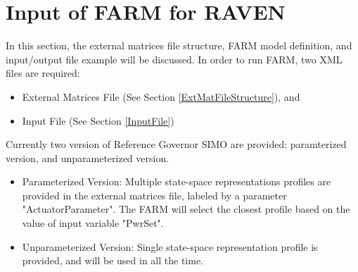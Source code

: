 



\section{Input of FARM for RAVEN}

In this section, the external matrices file structure, FARM model definition, and input/output file example will be 
discussed. In order to run FARM, two XML files are required:
\begin{itemize}
  \item External Matrices File (See Section \ref{ExtMatFileStructure}), and
  \item Input File (See Section \ref{InputFile})
\end{itemize}
Currently two version of Reference Governor SIMO are provided: paramterized version, and unparameterized version. 
\begin{itemize}
  \item Parameterized Version: Multiple state-space representations profiles are provided in the external matrices file, 
  labeled by a parameter "ActuatorParameter". The FARM will select the closest profile based on the value of input 
  variable "PwrSet".
  \item Unparameterized Version: Single state-space representation profile is provided, and will be used in all the time.
\end{itemize}

